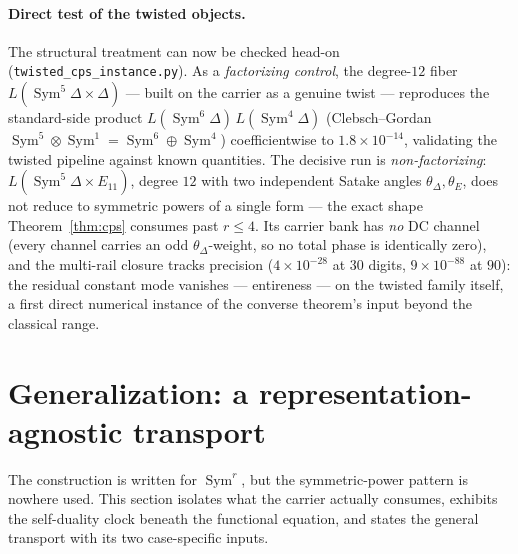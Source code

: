 \documentclass[11pt]{article}
\theoremstyle{definition}
\newcommand{\Sym}{\operatorname{Sym}}
\begin{document}
\paragraph{Direct test of the twisted objects.} The structural treatment can now be checked head-on
(\texttt{twisted\_cps\_instance.py}). As a \emph{factorizing control}, the degree-$12$ fiber
$L(\Sym^5\Delta\times\Delta)$ --- built on the carrier as a genuine twist --- reproduces the standard-side
product $L(\Sym^6\Delta)\,L(\Sym^4\Delta)$ (Clebsch--Gordan $\Sym^5\otimes\Sym^1=\Sym^6\oplus\Sym^4$)
coefficientwise to $1.8\times10^{-14}$, validating the twisted pipeline against known quantities. The decisive
run is \emph{non-factorizing}: $L(\Sym^5\Delta\times E_{11})$, degree $12$ with two independent Satake angles
$\theta_\Delta,\theta_E$, does not reduce to symmetric powers of a single form --- the exact shape
Theorem~\ref{thm:cps} consumes past $r\le4$. Its carrier bank has \emph{no} DC channel (every channel carries an
odd $\theta_\Delta$-weight, so no total phase is identically zero), and the multi-rail closure tracks precision
($4\times10^{-28}$ at $30$ digits, $9\times10^{-88}$ at $90$): the residual constant mode vanishes ---
entireness --- on the twisted family itself, a first direct numerical instance of the converse theorem's input
beyond the classical range.

\section{Generalization: a representation-agnostic transport}\label{sec:general}

The construction is written for $\Sym^r$, but the symmetric-power pattern is nowhere used. This section
isolates what the carrier actually consumes, exhibits the self-duality clock beneath the functional
equation, and states the general transport with its two case-specific inputs.
\end{document}
